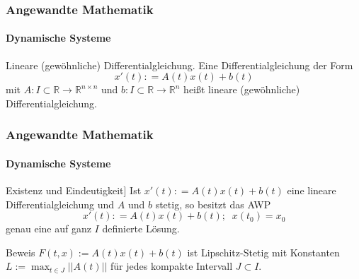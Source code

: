 \documentclass{beamer}
\begin{document}
\begin{frame}
    \frametitle{Angewandte Mathematik}
\framesubtitle{Dynamische Systeme }
\begin{block}{Lineare (gewöhnliche) Differentialgleichung.}
Eine Differentialgleichung der Form
$$ x' (t): = A(t) x(t) + b(t)$$
mit $A: I \subset \mathbb{R} \to \mathbb{R}^{n \times n}$ und $b: I \subset \mathbb{R} \to \mathbb{R}^{n}$ heißt lineare (gewöhnliche) Differentialgleichung.
\end{block}

 \end{frame}


\begin{frame}
    \frametitle{Angewandte Mathematik}
\framesubtitle{Dynamische Systeme }
\begin{block}{Existenz und Eindeutigkeit]}
Ist $x' (t): = A(t) x(t) + b(t)$ eine lineare Differentialgleichung und $A$ und $b$ stetig, so besitzt das AWP 
$$ x' (t): = A(t) x(t) + b(t) ; \; \; x(t_0) = x_0 $$
genau eine auf ganz $I$ definierte Lösung.
\end{block}
\begin{block}{Beweis}
$F(t,x):= A(t) x(t) + b(t)$ ist Lipschitz-Stetig mit Konstanten $L:= \max_{t \in J}|| A(t) ||$ für jedes kompakte Intervall $J \subset I$.
\end{block}
 \end{frame}
\end{document}
